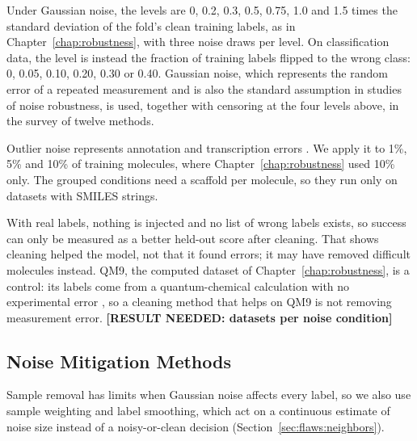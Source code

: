 Under Gaussian noise, the levels are 0, 0.2, 0.3, 0.5, 0.75, 1.0 and 1.5 times the standard deviation of the fold's clean training labels, as in Chapter~\ref{chap:robustness}, with three noise draws per level. On classification data, the level is instead the fraction of training labels flipped to the wrong class: 0, 0.05, 0.10, 0.20, 0.30 or 0.40. Gaussian noise, which represents the random error of a repeated measurement and is also the standard assumption in studies of noise robustness, is used, together with censoring at the four levels above, in the survey of twelve methods.

Outlier noise represents annotation and transcription errors \citep{Kalliokoski2013, Hampel2001}. We apply it to 1\%, 5\% and 10\% of training molecules, where Chapter~\ref{chap:robustness} used 10\% only. The grouped conditions need a scaffold per molecule, so they run only on datasets with SMILES strings.

With real labels, nothing is injected and no list of wrong labels exists, so success can only be measured as a better held-out score after cleaning. That shows cleaning helped the model, not that it found errors; it may have removed difficult molecules instead. QM9, the computed dataset of Chapter~\ref{chap:robustness}, is a control: its labels come from a quantum-chemical calculation with no experimental error \citep{Ramakrishnan2014}, so a cleaning method that helps on QM9 is not removing measurement error. \textbf{[RESULT NEEDED: datasets per noise condition]}



\subsection{Noise Mitigation Methods}\label{sec:similarity:mitigation}

Sample removal has limits when Gaussian noise affects every label, so we also use sample weighting and label smoothing, which act on a continuous estimate of noise size instead of a noisy-or-clean decision (Section~\ref{sec:flaws:neighbors}).

